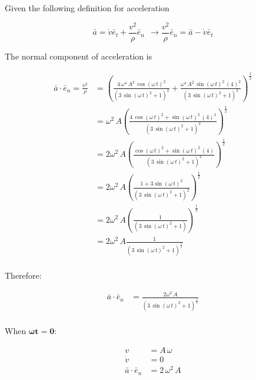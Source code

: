 \documentclass[12pt, letterpaper]{../assignment}
\begin{document}
Given the following definition for acceleration

$$ \bar{a} = \dot{v} \bar{e}_t + \frac{v^2}{\rho}\bar{e}_n \ \ \rightarrow  \frac{v^2}{\rho}\bar{e}_n = \bar{a} - \dot{v} \bar{e}_t  $$

The normal component of acceleration is 

\begin{equation*}
    \begin{aligned}
\bar{a} \cdot \bar{e}_n  =  \frac{v^2}{\rho} 
&= \left(\frac{4\,\omega ^4\,A^2\,\cos\left(\omega \,t\right)^2}{{\left(3\,{\sin\left(\omega \,t\right)}^2+1\right)}^2}+\frac{\omega ^4\,A^2\,\sin\left(\omega \,t\right)^2\,{\left(4\right)}^2}{{\left(3\,{\sin\left(\omega \,t\right)}^2+1\right)}^2}\right)^\frac{1}{2}\\
&= \omega^2\,A\left(\frac{4\,\cos\left(\omega \,t\right)^2+ \sin\left(\omega \,t\right)^2\,{\left(4\right)}^2}{{\left(3\,{\sin\left(\omega \,t\right)}^2+1\right)}^2}\right)^\frac{1}{2}\\
&= 2\omega^2\,A\left(\frac{\cos\left(\omega \,t\right)^2+ \sin\left(\omega \,t\right)^2\,{\left(4\right)}}{{\left(3\,{\sin\left(\omega \,t\right)}^2+1\right)}^2}\right)^\frac{1}{2}\\
&= 2\omega^2\,A\left(\frac{1+ 3\sin\left(\omega \,t\right)^2}{{\left(3\,{\sin\left(\omega \,t\right)}^2+1\right)}^2}\right)^\frac{1}{2}\\
&= 2\omega^2\,A\left(\frac{1}{{\left(3\,{\sin\left(\omega \,t\right)}^2+1\right)}}\right)^\frac{1}{2}\\
&= 2\omega^2\,A\frac{1}{{\left(3\,{\sin\left(\omega \,t\right)}^2+1\right)}^\frac{1}{2}}\\
\end{aligned}
\end{equation*}

Therefore:

\begin{answer}
\begin{equation*}
\begin{aligned}
\bar{a} \cdot \bar{e}_n
&= \frac{2\omega^2\,A}{{\left(3\,{\sin\left(\omega \,t\right)}^2+1\right)}^\frac{1}{2}}\\
\end{aligned}
\end{equation*}
\end{answer}

When $\bm{\omega t = 0}$:

\begin{answer}
\begin{equation*}
    \begin{aligned}
    v &= A\,\omega \\
    \dot{v} &= 0 \\    
    \bar{a} \cdot \bar{e}_n &= 2\,\omega^2\,{A}
    \end{aligned}
\end{equation*}
\end{answer}
\end{document}
